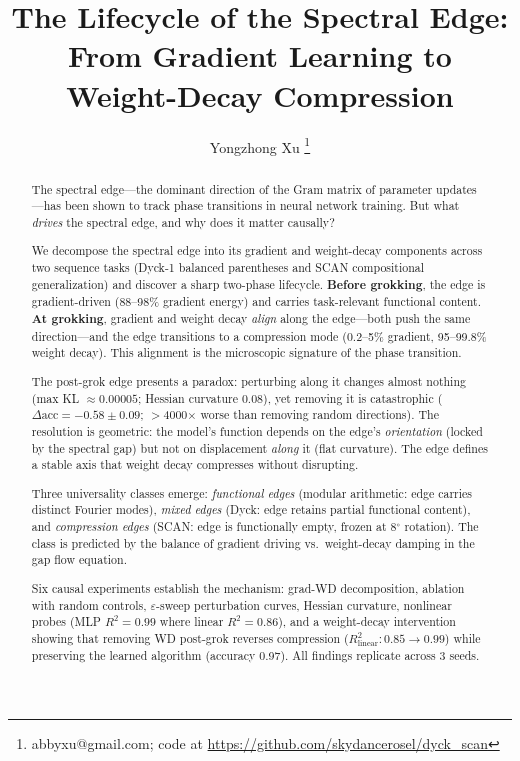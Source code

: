 \documentclass[11pt]{article}
\title{The Lifecycle of the Spectral Edge:\\From Gradient Learning to Weight-Decay Compression}
\author{%
  Yongzhong Xu%
  \thanks{abbyxu@gmail.com; code at \url{https://github.com/skydancerosel/dyck\_scan}}
}
\date{}
\begin{document}
\maketitle

\begin{abstract}

The spectral edge---the dominant direction of the Gram matrix of parameter updates---has been shown to track phase transitions in neural network training.
But what \emph{drives} the spectral edge, and why does it matter causally?

We decompose the spectral edge into its gradient and weight-decay components across two sequence tasks (Dyck-1 balanced parentheses and SCAN compositional generalization) and discover a sharp two-phase lifecycle.
\textbf{Before grokking}, the edge is gradient-driven (88--98\% gradient energy) and carries task-relevant functional content.
\textbf{At grokking}, gradient and weight decay \emph{align} along the edge---both push the same direction---and the edge transitions to a compression mode (0.2--5\% gradient, 95--99.8\% weight decay).
This alignment is the microscopic signature of the phase transition.

The post-grok edge presents a paradox: perturbing along it changes almost nothing (max KL $\approx 0.00005$; Hessian curvature $0.08$), yet removing it is catastrophic ($\Delta\text{acc} = -0.58 \pm 0.09$; $>$4000$\times$ worse than removing random directions).
The resolution is geometric: the model's function depends on the edge's \emph{orientation} (locked by the spectral gap) but not on displacement \emph{along} it (flat curvature).
The edge defines a stable axis that weight decay compresses without disrupting.

Three universality classes emerge:
\emph{functional edges} (modular arithmetic: edge carries distinct Fourier modes),
\emph{mixed edges} (Dyck: edge retains partial functional content),
and \emph{compression edges} (SCAN: edge is functionally empty, frozen at 8$^\circ$ rotation).
The class is predicted by the balance of gradient driving vs.\ weight-decay damping in the gap flow equation.

Six causal experiments establish the mechanism: grad-WD decomposition, ablation with random controls, $\varepsilon$-sweep perturbation curves, Hessian curvature, nonlinear probes (MLP $R^2 = 0.99$ where linear $R^2 = 0.86$), and a weight-decay intervention showing that removing WD post-grok reverses compression ($R^2_\text{linear}: 0.85 \to 0.99$) while preserving the learned algorithm (accuracy 0.97).
All findings replicate across 3 seeds.

\end{abstract}
\end{document}
